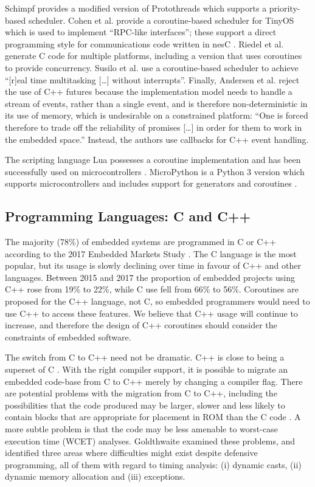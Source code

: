 \documentclass[format=acmsmall, review=false, screen=false]{acmart}
\providecommand{\DIFaddend}{} %
\DeclareRobustCommand{\DIFaddend}{\DIFOaddend \let\includegraphics\DIFOincludegraphics} %
\begin{document}
\DIFaddend Schimpf \cite{Schimpf2012b} provides a modified version of Protothreads which supports a priority-based scheduler. Cohen et al. \cite{Cohen2007b} provide a coroutine-based scheduler for TinyOS \cite{Levis2005} which is used to implement “RPC-like interfaces”; these support a direct programming style for communications code written in nesC \cite{Gay2003}. Riedel et al.\cite{Riedel2010} generate C code for multiple platforms, including a version that uses coroutines to provide concurrency. Susilo et al. \cite{Susilo2009} use a coroutine-based scheduler to achieve “[r]eal time multitasking […] without interrupts”. Finally, Andersen et al. \cite{Andersen2017b} reject the use of C++ futures because the implementation model needs to handle a stream of events, rather than a single event, and is therefore non-deterministic in its use of memory, which is undesirable on a constrained platform: “One is forced therefore to trade off the reliability of promises […] in order for them to work in the embedded space.” Instead, the authors use callbacks for C++ event handling.

The scripting language Lua possesses a coroutine implementation \cite{Moura2004a} and has been successfully used on microcontrollers \cite{Hempel2008}. MicroPython \cite{George2014a} is a Python 3 version which supports microcontrollers \cite{George2014b} and includes support for generators and coroutines \cite{VanRossum2005, Python2017}.

\subsection{Programming Languages: C and C++}

The majority (78\%) of embedded systems are programmed in C or C++ according to the 2017 Embedded Markets Study \cite{AspenCore2017}. The C language is the most popular, but its usage is slowly declining over time in favour of C++ and other languages. Between 2015 and 2017 the proportion of embedded projects using C++ rose from 19\% to 22\%, while C use fell from 66\% to 56\%. Coroutines are proposed for the C++ language, not C, so embedded programmers would need to use C++ to access these features. We believe that C++ usage will continue to increase, and therefore the design of C++ coroutines should consider the constraints of embedded software.  

The switch from C to C++ need not be dramatic. C++ is close to being a superset of C \cite{Stroustrup1986}. With the right compiler support, it is possible to migrate an embedded code-base from C to C++ merely by changing a compiler flag. There are potential problems with the migration from C to C++, including the possibilities that the code produced may be larger, slower and less likely to contain blocks that are appropriate for placement in ROM than the C code \cite{Goldthwaite2006, Herity2015}. A more subtle problem is that the code may be less amenable to worst-case execution time (WCET) analyses. Goldthwaite \cite{Goldthwaite2006} examined these problems, and identified three areas where difficulties might exist despite defensive programming, all of them with regard to timing analysis: (i) dynamic casts, (ii) dynamic memory allocation and (iii) exceptions.
\end{document}
